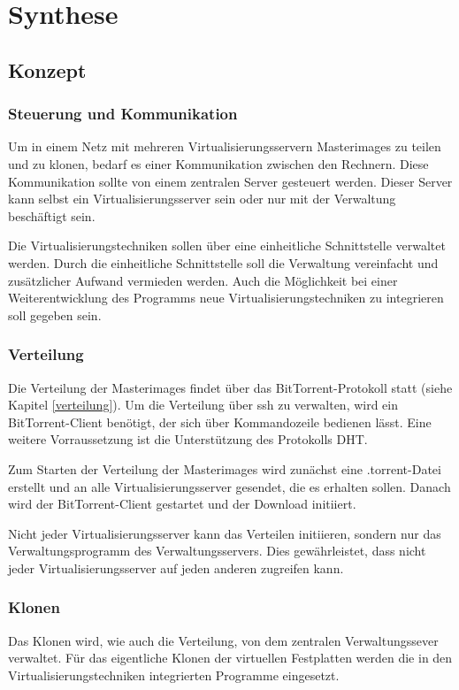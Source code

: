 \chapter{Synthese}
\section{Konzept}
\subsection{Steuerung und Kommunikation}
Um in einem Netz mit mehreren Virtualisierungsservern Masterimages zu teilen und zu klonen, bedarf es einer Kommunikation zwischen den Rechnern. Diese Kommunikation sollte von einem zentralen Server gesteuert werden. Dieser Server kann selbst ein Virtualisierungsserver sein oder nur mit der Verwaltung beschäftigt sein.

Die Virtualisierungstechniken sollen über eine einheitliche Schnittstelle verwaltet werden. Durch die einheitliche Schnittstelle soll die Verwaltung vereinfacht und zusätzlicher Aufwand vermieden werden. Auch die Möglichkeit bei einer Weiterentwicklung des Programms neue Virtualisierungstechniken zu integrieren soll gegeben sein.

\subsection{Verteilung}
Die Verteilung der Masterimages findet über das BitTorrent-Protokoll statt (siehe Kapitel \ref{verteilung}). Um die Verteilung über ssh zu verwalten, wird ein BitTorrent-Client benötigt, der sich über Kommandozeile bedienen lässt. Eine weitere Vorraussetzung ist die Unterstützung des Protokolls DHT. 

Zum Starten der Verteilung der Masterimages wird zunächst eine .torrent-Datei erstellt und an alle Virtualisierungsserver gesendet, die es erhalten sollen. Danach wird der BitTorrent-Client gestartet und der Download initiiert.

Nicht jeder Virtualisierungsserver kann das Verteilen initiieren, sondern nur das Verwaltungsprogramm des Verwaltungsservers. Dies gewährleistet, dass nicht jeder Virtualisierungsserver auf jeden anderen zugreifen kann.

\subsection{Klonen}
Das Klonen wird, wie auch die Verteilung, von dem zentralen Verwaltungssever verwaltet. Für das eigentliche Klonen der virtuellen Festplatten werden die in den Virtualisierungstechniken integrierten Programme eingesetzt. 

